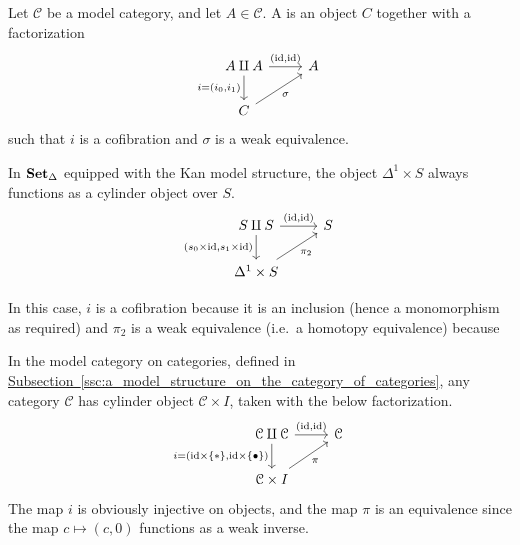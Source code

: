 \documentclass[main.tex]{subfiles}
\begin{document}
\begin{definition}
  \label{def:cylinder_object}
  Let $\mathcal{C}$ be a model category, and let $A \in \mathcal{C}$. A  is an object $C$ together with a factorization
  \begin{equation*}
    \begin{tikzcd}
      A \amalg A
      \arrow[r, "{(\id, \id)}"]
      \arrow[d, swap, "{i = (i_{0}, i_{1})}"]
      & A
      \\
      C
      \arrow[ur, swap, "\sigma"]
    \end{tikzcd}
  \end{equation*}
  such that $i$ is a cofibration and $\sigma$ is a weak equivalence.
\end{definition}

\begin{example}
  \label{eg:cylinder_objects_in_sset}
  In $\operatorname{\mathbf{Set}_{\Delta}}$ equipped with the Kan model structure, the object $\Delta^{1} \times S$ always functions as a cylinder object over $S$.
  \begin{equation*}
    \begin{tikzcd}
      S \amalg S
      \arrow[r, "{(\id, \id)}"]
      \arrow[d, swap, "{(s_{0} \times \id, s_{1} \times \id)}"]
      & S
      \\
      \Delta^{1} \times S
      \arrow[ur, swap, "\pi_{2}"]
    \end{tikzcd}
  \end{equation*}

  In this case, $i$ is a cofibration because it is an inclusion (hence a monomorphism as required) and $\pi_{2}$ is a weak equivalence (i.e.\ a homotopy equivalence) because
\end{example}

\begin{example}
  \label{eg:cylinder_objects_in_model_structure_on_cat}
  In the model category on categories, defined in \hyperref[ssc:a_model_structure_on_the_category_of_categories]{Subsection~\ref*{ssc:a_model_structure_on_the_category_of_categories}}, any category $\mathcal{C}$ has cylinder object $\mathcal{C} \times I$, taken with the below factorization.
  \begin{equation*}
    \begin{tikzcd}
      \mathcal{C} \amalg \mathcal{C}
      \arrow[d, swap, "i = {(\id \times \{*\}, \id \times \{\bullet\})}"]
      \arrow[r, "{(\id, \id)}"]
      & \mathcal{C}
      \\
      \mathcal{C} \times I
      \arrow[ur, swap, "\pi"]
    \end{tikzcd}
  \end{equation*}
  The map $i$ is obviously injective on objects, and the map $\pi$ is an equivalence since the map $c \mapsto (c, 0)$ functions as a weak inverse.
\end{example}
\end{document}
